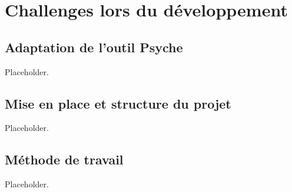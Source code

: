 \section{Challenges lors du développement}

\subsection{Adaptation de l'outil Psyche}

Placeholder.

\subsection{Mise en place et structure du projet}

Placeholder.

\subsection{Méthode de travail}

Placeholder.